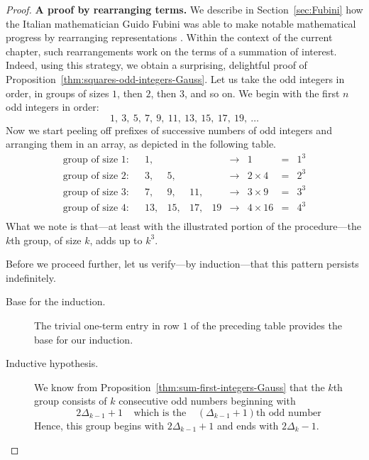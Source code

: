 \begin{proof}
{\bf A proof by rearranging terms.}
%
We describe in Section~\ref{sec:Fubini} how the Italian mathematician
Guido Fubini
%
was able to make notable mathematical progress by rearranging
representations \cite{Fubini}.  Within the context of the current
chapter, such rearrangements work on the terms of a summation of
interest.  Indeed, using this strategy, we obtain a surprising,
delightful proof of Proposition~\ref{thm:squares-odd-integers-Gauss}.
Let us take the odd integers in order, in groups of sizes $1$, then
$2$, then $3$, and so on.  We begin with the first $n$ odd integers in
order:
\[ 1, \ 3, \ 5, \ 7, \ 9, \ 11, \ 13, \ 15, \ 17, \ 19, \ \ldots \]
Now we start peeling off prefixes of successive numbers of odd
integers and arranging them in an array, as depicted in
the following table.
\[
\begin{array}{llrrrrclcc}
\mbox{group of size 1:} & &
1,  &    &     &     &  \rightarrow & 1           & = & 1^3 \\
\mbox{group of size 2:} & &
3,  &  5, &     &    &  \rightarrow & 2 \times 4  & = & 2^3 \\
\mbox{group of size 3:} & &
7,  &  9, & 11, &    &  \rightarrow & 3 \times 9  & = & 3^3 \\
\mbox{group of size 4:} & &
13, & 15, & 17, & 19 &  \rightarrow & 4 \times 16 & = & 4^3 \\
\end{array}
\]
What we note is that---at least with the illustrated portion of the
procedure---the $k$th group, of size $k$, adds up to $k^3$.


Before we proceed further, let us verify---by induction---that this
pattern persists indefinitely.
\begin{description}
\item[{\sf Base for the induction.}]
The trivial one-term entry in row $1$ of the preceding table
provides the base for our induction.

\medskip

\item[{\sf Inductive hypothesis}.]
We know from Proposition~\ref{thm:sum-first-integers-Gauss} that the
$k$th group consists of $k$ consecutive odd numbers beginning with
\[ 2 \Delta_{k-1} +1 \ \ \ \ \
\mbox{which is the} \ \ \ \ \
\left( \Delta_{k-1} +1 \right)\mbox{th odd number}
\]
Hence, this group begins with $2 \Delta_{k-1} +1$ and ends with
$2\Delta_k -1$.


\end{description}
\end{proof}

